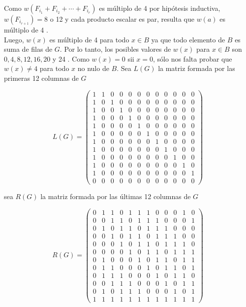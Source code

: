 \documentclass[10pt]{article}
\begin{document}
Como $w\left(F_{i_{1}}+F_{i_{2}}+\cdots+F_{i_{r}}\right)$ es múltiplo de 4 por hipótesis inductiva, $w\left(F_{i_{r+1}}\right)=8$ o 12 y cada producto escalar es par, resulta que $w(a)$ es múltiplo de 4 .\\
Luego, $w(x)$ es múltiplo de 4 para todo $x \in B$ ya que todo elemento de $B$ es suma de filas de $G$. Por lo tanto, los posibles valores de $w(x)$ para $x \in B$ son $0,4,8,12,16,20$ y 24 . Como $w(x)=0$ sii $x=0$, sólo nos falta probar que $w(x) \neq 4$ para todo $x$ no nulo de $B$. Sea $L(G)$ la matriz formada por las primeras 12 columnas de $G$

$$
L(G)=\left(\begin{array}{cccccccccccc}
1 & 1 & 0 & 0 & 0 & 0 & 0 & 0 & 0 & 0 & 0 & 0 \\
1 & 0 & 1 & 0 & 0 & 0 & 0 & 0 & 0 & 0 & 0 & 0 \\
1 & 0 & 0 & 1 & 0 & 0 & 0 & 0 & 0 & 0 & 0 & 0 \\
1 & 0 & 0 & 0 & 1 & 0 & 0 & 0 & 0 & 0 & 0 & 0 \\
1 & 0 & 0 & 0 & 0 & 1 & 0 & 0 & 0 & 0 & 0 & 0 \\
1 & 0 & 0 & 0 & 0 & 0 & 1 & 0 & 0 & 0 & 0 & 0 \\
1 & 0 & 0 & 0 & 0 & 0 & 0 & 1 & 0 & 0 & 0 & 0 \\
1 & 0 & 0 & 0 & 0 & 0 & 0 & 0 & 1 & 0 & 0 & 0 \\
1 & 0 & 0 & 0 & 0 & 0 & 0 & 0 & 0 & 1 & 0 & 0 \\
1 & 0 & 0 & 0 & 0 & 0 & 0 & 0 & 0 & 0 & 1 & 0 \\
1 & 0 & 0 & 0 & 0 & 0 & 0 & 0 & 0 & 0 & 0 & 1 \\
0 & 0 & 0 & 0 & 0 & 0 & 0 & 0 & 0 & 0 & 0 & 0
\end{array}\right)
$$

sea $R(G)$ la matriz formada por las últimas 12 columnas de $G$

$$
R(G)=\left(\begin{array}{llllllllllll}
0 & 1 & 1 & 0 & 1 & 1 & 1 & 0 & 0 & 0 & 1 & 0 \\
0 & 0 & 1 & 1 & 0 & 1 & 1 & 1 & 0 & 0 & 0 & 1 \\
0 & 1 & 0 & 1 & 1 & 0 & 1 & 1 & 1 & 0 & 0 & 0 \\
0 & 0 & 1 & 0 & 1 & 1 & 0 & 1 & 1 & 1 & 0 & 0 \\
0 & 0 & 0 & 1 & 0 & 1 & 1 & 0 & 1 & 1 & 1 & 0 \\
0 & 0 & 0 & 0 & 1 & 0 & 1 & 1 & 0 & 1 & 1 & 1 \\
0 & 1 & 0 & 0 & 0 & 1 & 0 & 1 & 1 & 0 & 1 & 1 \\
0 & 1 & 1 & 0 & 0 & 0 & 1 & 0 & 1 & 1 & 0 & 1 \\
0 & 1 & 1 & 1 & 0 & 0 & 0 & 1 & 0 & 1 & 1 & 0 \\
0 & 0 & 1 & 1 & 1 & 0 & 0 & 0 & 1 & 0 & 1 & 1 \\
0 & 1 & 0 & 1 & 1 & 1 & 0 & 0 & 0 & 1 & 0 & 1 \\
1 & 1 & 1 & 1 & 1 & 1 & 1 & 1 & 1 & 1 & 1 & 1
\end{array}\right)
$$
\end{document}
